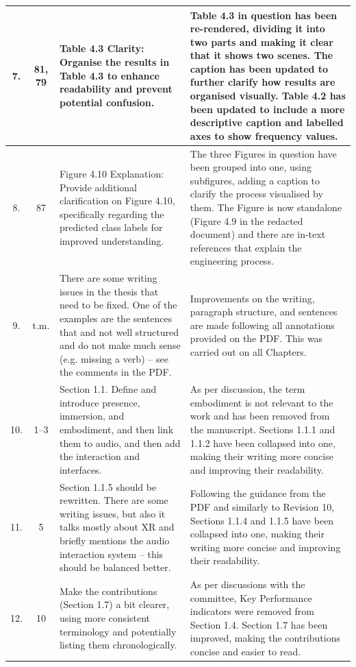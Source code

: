 \documentclass[a4paper]{article}
\begin{document}
\begin{center}
\begin{longtable}{|c|c|C{7.5cm}|C{7.5cm}|}
		7. & 81, 79 & Table 4.3 Clarity: Organise the results in Table 4.3 to enhance readability and prevent potential confusion. & Table 4.3 in question has been re-rendered, dividing it into two parts and making it clear that it shows two scenes. The caption has been updated to further clarify how results are organised visually. Table 4.2 has been updated to include a more descriptive caption and labelled axes to show frequency values. \tabularnewline
		\hline

		8. & 87 & Figure 4.10 Explanation: Provide additional clarification on Figure 4.10, specifically regarding the predicted class labels for improved understanding. & The three Figures in question have been grouped into one, using subfigures, adding a caption to clarify the process visualised by them. The Figure is now standalone (Figure 4.9 in the redacted document) and there are in-text references that explain the engineering process. \tabularnewline
		\hline
		
		9. & t.m. & There are some writing issues in the thesis that need to be fixed. One of the examples are the sentences that and not well structured and do not make much sense (e.g. missing a verb) – see the comments in the PDF. & Improvements on the writing, paragraph structure, and sentences are made following all annotations provided on the PDF. This was carried out on all Chapters.\tabularnewline
		\hline

		10. & 1--3 & Section 1.1. Define and introduce presence, immersion, and embodiment, and then link them to audio, and then add the interaction and interfaces. & As per discussion, the term embodiment is not relevant to the work and has been removed from the manuscript. Sections 1.1.1 and 1.1.2 have been collapsed into one, making their writing more concise and improving their readability.\tabularnewline
		\hline 
		
		11. & 5 & Section 1.1.5 should be rewritten. There are some writing issues, but also it talks mostly about XR and briefly mentions the audio interaction system – this should be balanced better. & Following the guidance from the PDF and similarly to Revision 10, Sections 1.1.4 and 1.1.5 have been collapsed into one, making their writing more concise and improving their readability.\tabularnewline
		\hline 
		
		12. & 10 & Make the contributions (Section 1.7) a bit clearer, using more consistent terminology and potentially listing them chronologically. & As per discussions with the committee, Key Performance indicators were removed from Section 1.4. Section 1.7 has been improved, making the contributions concise and easier to read.\tabularnewline
		\hline 


\end{longtable}
\end{center}
\end{document}
